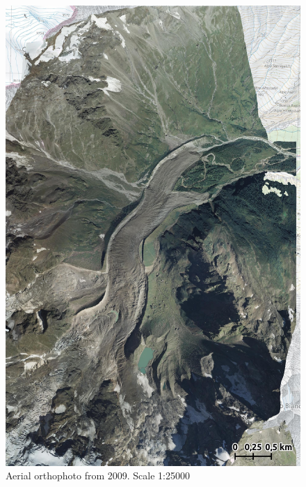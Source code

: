 \begin{figure}[p]
    \centering
    \includegraphics[width=\textwidth]{figures/appendix/orto_2009.jpg}
    \caption{Aerial orthophoto from 2009. Scale 1:25000}
\end{figure}

